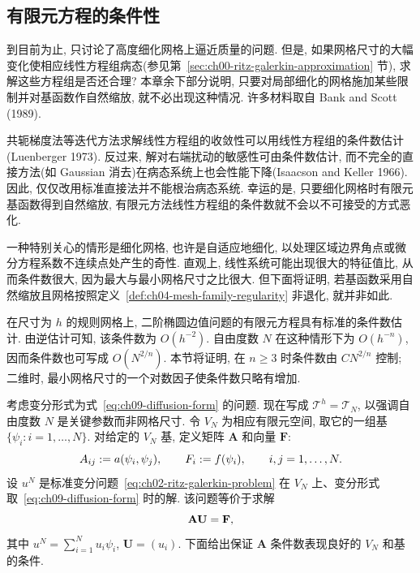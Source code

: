 \subsection{有限元方程的条件性}
\label{sec:ch09-conditioning-finite-element-equations}
\setcounter{thmcount}{0}
\setcounter{equation}{0}

到目前为止, 只讨论了高度细化网格上逼近质量的问题. 但是, 如果网格尺寸的大幅变化使相应线性方程组病态(参见第~\ref{sec:ch00-ritz-galerkin-approximation} 节), 求解这些方程组是否还合理? 本章余下部分说明, 只要对局部细化的网格施加某些限制并对基函数作自然缩放, 就不必出现这种情况. 许多材料取自 Bank and Scott (1989).

共轭梯度法等迭代方法求解线性方程组的收敛性可以用线性方程组的条件数估计(Luenberger 1973). 反过来, 解对右端扰动的敏感性可由条件数估计, 而不完全的直接方法(如 Gaussian 消去)在病态系统上也会性能下降(Isaacson and Keller 1966). 因此, 仅仅改用标准直接法并不能根治病态系统. 幸运的是, 只要细化网格时有限元基函数得到自然缩放, 有限元方法线性方程组的条件数就不会以不可接受的方式恶化.

一种特别关心的情形是细化网格, 也许是自适应地细化, 以处理区域边界角点或微分方程系数不连续点处产生的奇性. 直观上, 线性系统可能出现很大的特征值比, 从而条件数很大, 因为最大与最小网格尺寸之比很大. 但下面将证明, 若基函数采用自然缩放且网格按照定义~\ref{def:ch04-mesh-family-regularity} 非退化, 就并非如此.

在尺寸为 $h$ 的规则网格上, 二阶椭圆边值问题的有限元方程具有标准的条件数估计. 由逆估计可知, 该条件数为 $O(h^{-2})$. 自由度数 $N$ 在这种情形下为 $O(h^{-n})$, 因而条件数也可写成 $O(N^{2/n})$. 本节将证明, 在 $n\geq3$ 时条件数由 $CN^{2/n}$ 控制; 二维时, 最小网格尺寸的一个对数因子使条件数只略有增加.

考虑变分形式为式~\eqref{eq:ch09-diffusion-form} 的问题. 现在写成 $\mathcal T^h=\mathcal T_N$, 以强调自由度数 $N$ 是关键参数而非网格尺寸. 令 $V_N$ 为相应有限元空间, 取它的一组基 $\{\psi_i:i=1,\ldots,N\}$. 对给定的 $V_N$ 基, 定义矩阵 $\mathbf A$ 和向量 $\mathbf F$:
\[
\MathBookFormulaID{formula-ch09-stiffness-matrix-load-vector}
A_{ij}:=a(\psi_i,\psi_j),
\qquad
F_i:=f(\psi_i),
\qquad i,j=1,\ldots,N.
\]
设 $u^N$ 是标准变分问题~\eqref{eq:ch02-ritz-galerkin-problem} 在 $V_N$ 上、变分形式取~\eqref{eq:ch09-diffusion-form} 时的解. 该问题等价于求解
\[
\MathBookFormulaID{formula-ch09-finite-element-linear-system}
\mathbf A\mathbf U=\mathbf F,
\]
其中 $u^N=\sum_{i=1}^Nu_i\psi_i$, $\mathbf U=(u_i)$. 下面给出保证 $\mathbf A$ 条件数表现良好的 $V_N$ 和基的条件.

